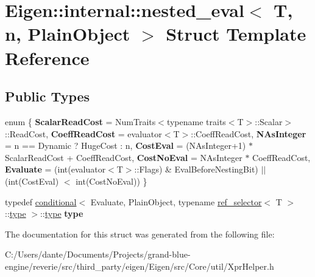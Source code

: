 \hypertarget{struct_eigen_1_1internal_1_1nested__eval}{}\section{Eigen\+::internal\+::nested\+\_\+eval$<$ T, n, Plain\+Object $>$ Struct Template Reference}
\label{struct_eigen_1_1internal_1_1nested__eval}
\subsection*{Public Types}
\begin{DoxyCompactItemize}
\item 
\mbox{\label{struct_eigen_1_1internal_1_1nested__eval_aa3994f4c0435cfab9d278578d8976016}} 
enum \{ \newline
{\bfseries Scalar\+Read\+Cost} = Num\+Traits$<$typename traits$<$T$>$\+::Scalar$>$\+::Read\+Cost, 
{\bfseries Coeff\+Read\+Cost} = evaluator$<$T$>$\+::Coeff\+Read\+Cost, 
{\bfseries N\+As\+Integer} = n == Dynamic ? Huge\+Cost \+: n, 
{\bfseries Cost\+Eval} = (N\+As\+Integer+1) $\ast$ Scalar\+Read\+Cost + Coeff\+Read\+Cost, 
\newline
{\bfseries Cost\+No\+Eval} = N\+As\+Integer $\ast$ Coeff\+Read\+Cost, 
{\bfseries Evaluate} = (int(evaluator$<$T$>$\+::Flags) \& Eval\+Before\+Nesting\+Bit) $\vert$$\vert$ (int(Cost\+Eval) $<$ int(Cost\+No\+Eval))
 \}
\item 
\mbox{\label{struct_eigen_1_1internal_1_1nested__eval_a3e0ad119cd1fee5aba6b98cb7e7ad2fe}} 
typedef \mbox{\hyperlink{struct_eigen_1_1internal_1_1conditional}{conditional}}$<$ Evaluate, Plain\+Object, typename \mbox{\hyperlink{struct_eigen_1_1internal_1_1ref__selector}{ref\+\_\+selector}}$<$ T $>$\+::\mbox{\hyperlink{struct_eigen_1_1internal_1_1true__type}{type}} $>$\+::\mbox{\hyperlink{struct_eigen_1_1internal_1_1true__type}{type}} {\bfseries type}
\end{DoxyCompactItemize}


The documentation for this struct was generated from the following file\+:\begin{DoxyCompactItemize}
\item 
C\+:/\+Users/dante/\+Documents/\+Projects/grand-\/blue-\/engine/reverie/src/third\+\_\+party/eigen/\+Eigen/src/\+Core/util/Xpr\+Helper.\+h\end{DoxyCompactItemize}

